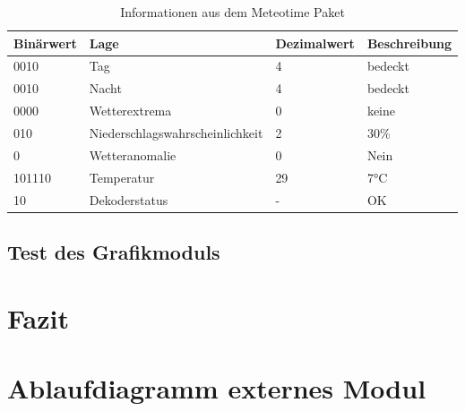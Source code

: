 \documentclass[a4paper,11pt]{article}
\begin{document}
\begin{table}[H]
  \centering
  \begin{tabular}{|l|l|l|l|}
  \hline
  \textbf{Binärwert} & \textbf{Lage}                   & \textbf{Dezimalwert} & \textbf{Beschreibung} \\ \hline
  0010               & Tag                             & 4                    & bedeckt               \\ \hline
  0010               & Nacht                           & 4                    & bedeckt               \\ \hline
  0000               & Wetterextrema                   & 0                    & keine                 \\ \hline
  010                & Niederschlagswahrscheinlichkeit & 2                    & 30\%                  \\ \hline
  0                  & Wetteranomalie                  & 0                    & Nein                  \\ \hline
  101110             & Temperatur                      & 29                   & 7°C                   \\ \hline
  10                 & Dekoderstatus                   & -                    & OK                    \\ \hline
  \end{tabular}
  \caption{Informationen aus dem Meteotime Paket}
  \label{tab:meteopacket}
  \end{table}

\subsection{Test des Grafikmoduls}

\section{Fazit}
\label{sub:fazit}

\newpage
\appendix

\section{Ablaufdiagramm externes Modul}
\label{subapp:ablaufExt}
\end{document}

